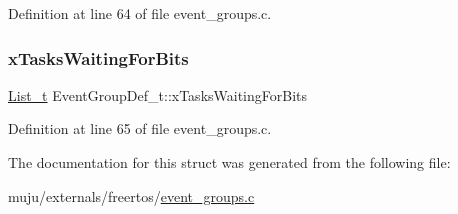 Definition at line 64 of file event\+\_\+groups.\+c.

\mbox{\label{struct_event_group_def__t_a3dd347560456bfe452415efb52760dc3}} 
\subsubsection{\texorpdfstring{x\+Tasks\+Waiting\+For\+Bits}{xTasksWaitingForBits}}
{\footnotesize\ttfamily \hyperlink{externals_2freertos_2include_2list_8h_afd590ef6400071b4d63d65ef90bea7f4}{List\+\_\+t} Event\+Group\+Def\+\_\+t\+::x\+Tasks\+Waiting\+For\+Bits}



Definition at line 65 of file event\+\_\+groups.\+c.



The documentation for this struct was generated from the following file\+:\begin{DoxyCompactItemize}
\item 
muju/externals/freertos/\hyperlink{externals_2freertos_2event__groups_8c}{event\+\_\+groups.\+c}\end{DoxyCompactItemize}
